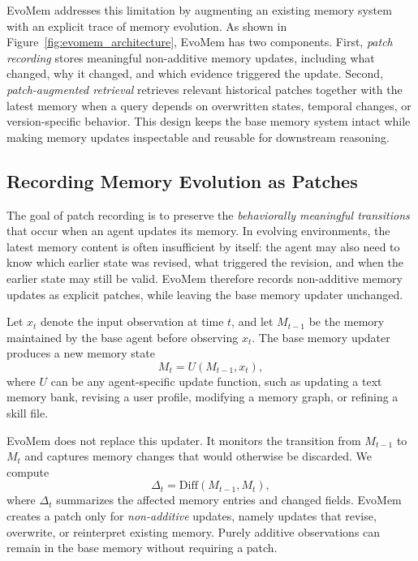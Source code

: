 \documentclass{article}
\begin{document}
EvoMem addresses this limitation by augmenting an existing memory system with an explicit trace of memory evolution. As shown in Figure~\ref{fig:evomem_architecture}, EvoMem has two components. First, \emph{patch recording} stores meaningful non-additive memory updates, including what changed, why it changed, and which evidence triggered the update. Second, \emph{patch-augmented retrieval} retrieves relevant historical patches together with the latest memory when a query depends on overwritten states, temporal changes, or version-specific behavior. This design keeps the base memory system intact while making memory updates inspectable and reusable for downstream reasoning.







\subsection{Recording Memory Evolution as Patches}
\label{sec:patch_record}

The goal of patch recording is to preserve the \emph{behaviorally meaningful transitions} that occur when an agent updates its memory. In evolving environments, the latest memory content is often insufficient by itself: the agent may also need to know which earlier state was revised, what triggered the revision, and when the earlier state may still be valid. EvoMem therefore records non-additive memory updates as explicit patches, while leaving the base memory updater unchanged.

Let $x_t$ denote the input observation at time $t$, and let $M_{t-1}$ be the memory maintained by the base agent before observing $x_t$. The base memory updater produces a new memory state
\[
M_t = U(M_{t-1}, x_t),
\]
where $U$ can be any agent-specific update function, such as updating a text memory bank, revising a user profile, modifying a memory graph, or refining a skill file.

EvoMem does not replace this updater. It monitors the transition from $M_{t-1}$ to $M_t$ and captures memory changes that would otherwise be discarded. We compute
\[
\Delta_t = \mathrm{Diff}(M_{t-1}, M_t),
\]
where $\Delta_t$ summarizes the affected memory entries and changed fields. EvoMem creates a patch only for \emph{non-additive} updates, namely updates that revise, overwrite, or reinterpret existing memory. Purely additive observations can remain in the base memory without requiring a patch.
\end{document}
